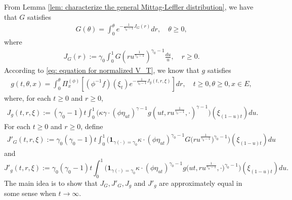 \documentclass[12pt,a4paper]{amsart}
\theoremstyle{definition}
\numberwithin{equation}{section}
\begin{document}
From Lemma \ref{lem: characterize the general Mittag-Leffler distribution}, we have that $G$ satisfies
\begin{align}\label{eq: equation for G}
	G(\theta)
	= \int_0^\theta e^{ - \frac{1} {\gamma_0 - 1} J_G(r)} dr,
	\quad \theta \geq 0,
\end{align}
where
\begin{align}\label{eq: definition for J_G}
	J_G(r):=
	\gamma_0 \int_0^1 G(ru^{\frac{1}{\gamma_0 - 1}}) ^{\gamma_0 - 1}\frac{du}{u},
	\quad r\geq 0 .
\end{align}
According to \eqref{eq: equation for normalized V_T}, we know that $g$ satisfies
\begin{align}\label{eq: equation for g}
	g(t,\theta, x)= \int_0^{\theta} \Pi_x^{(\phi)} [ (\phi^{-1}f)(\xi_t) e^{-\frac{1}{\gamma_0 - 1} J_g(t,r,\xi) } ] dr,
	\quad t\geq 0, \theta \geq 0, x\in E,
\end{align}
where, for each $t\geq 0$ and $r\geq 0$,
\begin{align}\label{eq: definition for J_g}
	J_g(t,r,\xi):=
	(\gamma_0 - 1)t\int_0^1 \big(  \kappa \gamma \cdot (   \phi \eta_{ut}  )^{\gamma - 1} g (ut,ru^{\frac{1}{\gamma_0 - 1}},\cdot )^{\gamma-1}  \big) (  \xi_{(1-u)t}  ) du.
\end{align}
For each $t\geq 0$ and $r\geq 0$, define
\begin{align}\label{eq: definition of J'_G}
	J'_G(t,r,\xi):=
	\gamma_0 (\gamma_0 - 1) t \int_0^1 \big( \mathbf 1_{\gamma(\cdot) = \gamma_0} \kappa \cdot (\phi \eta_{ut})^{\gamma_0 - 1} G\big( ru^{\frac{1}{\gamma_0 - 1}} \big) ^{\gamma_0 - 1} \big) (\xi_{(1-u)t}) du
\end{align}
and
\begin{equation}\label{eq: definition of J'_g}
	J'_g(t,r,\xi):=
	\gamma_0 (\gamma_0 - 1) t \int_0^1 \big( \mathbf 1_{\gamma(\cdot) = \gamma_0} \kappa \cdot (\phi \eta_{ut})^{\gamma_0 - 1} g\big( ut,ru^{\frac{1}{\gamma_0 - 1}}, \cdot \big)^{\gamma_0 - 1}  \big) (\xi_{(1-u)t})  du.
\end{equation}
The main idea is to show that $J_G,J'_G,J_g$ and $J'_g$ are approximately equal in some sense when $t\to \infty$.
	
\end{document}
